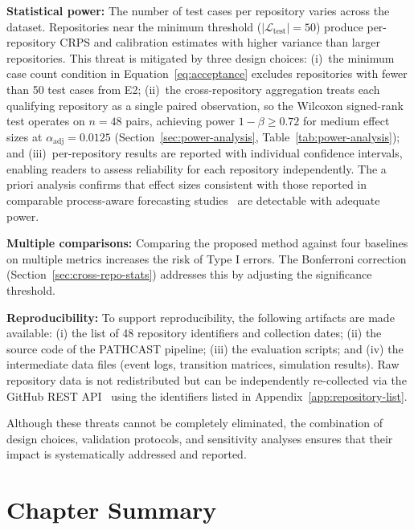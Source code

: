\textbf{Statistical power:} The number of test cases per repository
varies across the dataset. Repositories near the minimum threshold
($|\mathcal{L}_{\text{test}}| = 50$) produce per-repository CRPS and
calibration estimates with higher variance than larger repositories.
This threat is mitigated by three design choices: (i)~the minimum case
count condition in Equation~\ref{eq:acceptance} excludes repositories
with fewer than 50 test cases from E2; (ii)~the cross-repository
aggregation treats each qualifying repository as a single paired
observation, so the Wilcoxon signed-rank test operates on $n = 48$
pairs, achieving power $1 - \beta \geq 0.72$ for medium effect sizes
at $\alpha_{\text{adj}} = 0.0125$ (Section~\ref{sec:power-analysis},
Table~\ref{tab:power-analysis}); and (iii)~per-repository results are
reported with individual confidence intervals, enabling readers to
assess reliability for each repository independently. The a priori
analysis confirms that effect sizes consistent with those reported in
comparable process-aware forecasting
studies~\cite{RoggeSolti2015NonMarkovianSPN} are detectable with
adequate power.

\textbf{Multiple comparisons:} Comparing the proposed method against 
four baselines on multiple metrics increases the risk of Type I errors. 
The Bonferroni correction (Section~\ref{sec:cross-repo-stats}) 
addresses this by adjusting the significance threshold.

\textbf{Reproducibility:} To support reproducibility, the following 
artifacts are made available: (i) the list of 48 repository identifiers
and collection dates; (ii) the source code of the PATHCAST pipeline;
(iii) the evaluation scripts; and (iv) the intermediate data files
(event logs, transition matrices, simulation results). Raw repository
data is not redistributed but can be independently re-collected via the
GitHub REST API~\cite{github2023api} using the identifiers listed in
Appendix~\ref{app:repository-list}.

Although these threats cannot be completely eliminated, the combination
of design choices, validation protocols, and sensitivity analyses ensures
that their impact is systematically addressed and reported.


\section{Chapter Summary}
\label{sec:methodology-summary}

